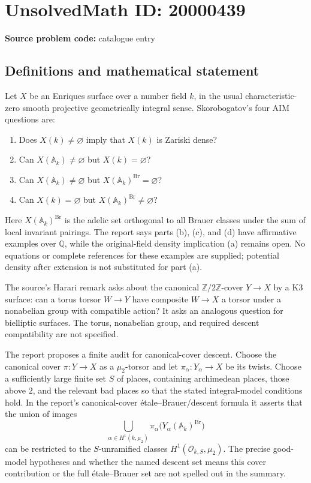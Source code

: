 \documentclass[11pt]{article}
\newcommand{\Z}{\mathbb{Z}}
\newcommand{\Q}{\mathbb{Q}}
\begin{document}
\section*{UnsolvedMath ID: 20000439}
\textbf{Source problem code:} catalogue entry
\subsection{Definitions and mathematical statement}
Let \(X\) be an Enriques surface over a number field \(k\), in the usual characteristic-zero smooth projective geometrically integral sense. Skorobogatov's four AIM questions are:
\begin{enumerate}
\item Does \(X(k)\ne\varnothing\) imply that \(X(k)\) is Zariski dense?
\item Can \(X(\mathbb A_k)\ne\varnothing\) but \(X(k)=\varnothing\)?
\item Can \(X(\mathbb A_k)\ne\varnothing\) but \(X(\mathbb A_k)^{\operatorname{Br}}=\varnothing\)?
\item Can \(X(k)=\varnothing\) but \(X(\mathbb A_k)^{\operatorname{Br}}\ne\varnothing\)?
\end{enumerate}
Here \(X(\mathbb A_k)^{\operatorname{Br}}\) is the adelic set orthogonal to all Brauer classes under the sum of local invariant pairings. The report says parts (b), (c), and (d) have affirmative examples over \(\Q\), while the original-field density implication (a) remains open. No equations or complete references for these examples are supplied; potential density after extension is not substituted for part (a).

The source's Harari remark asks about the canonical \(\Z/2\Z\)-cover \(Y\to X\) by a K3 surface: can a torus torsor \(W\to Y\) have composite \(W\to X\) a torsor under a nonabelian group with compatible action? It asks an analogous question for bielliptic surfaces. The torus, nonabelian group, and required descent compatibility are not specified.

The report proposes a finite audit for canonical-cover descent. Choose the canonical cover \(\pi:Y\to X\) as a \(\mu_2\)-torsor and let \(\pi_\alpha:Y_\alpha\to X\) be its twists. Choose a sufficiently large finite set \(S\) of places, containing archimedean places, those above \(2\), and the relevant bad places so that the stated integral-model conditions hold. In the report's canonical-cover \'etale--Brauer/descent formula it asserts that the union of images
\[
\bigcup_{\alpha\in H^1(k,\mu_2)}
\pi_\alpha\bigl(Y_\alpha(\mathbb A_k)^{\operatorname{Br}}\bigr)
\]
can be restricted to the \(S\)-unramified classes \(H^1(\mathcal O_{k,S},\mu_2)\). The precise good-model hypotheses and whether the named descent set means this cover contribution or the full \'etale--Brauer set are not spelled out in the summary.
\end{document}
